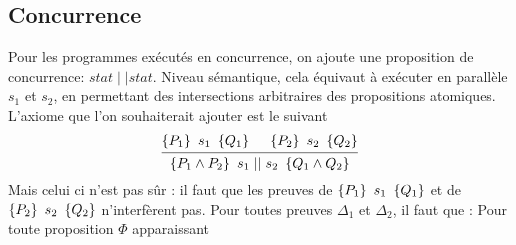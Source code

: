 \documentclass{cours}
\begin{document}
\subsection{Concurrence}
Pour les programmes exécutés en concurrence, on ajoute une proposition de concurrence: $stat \mid\mid stat$.
Niveau sémantique, cela équivaut à exécuter en parallèle $s_{1}$ et $s_{2}$, en permettant des intersections arbitraires des propositions atomiques.\\
L'axiome que l'on souhaiterait ajouter est le suivant
\begin{equation*}
	\begin{prooftree}
		\hypo{\hoare{P_{1}}{s_1}{Q_1}}
		\hypo{\hoare{P_2}{s_2}{Q_2}}
		\infer2{\hoare{P_1\land P_2}{s_{1} \mid \mid s_{2}}{Q_{1}\land Q_{2}}}
	\end{prooftree}
\end{equation*}
Mais celui ci n'est pas sûr : il faut que les preuves de $\left\{ P_{1}\right\}\ s_1 \ \left\{ Q_1\right\}$ et de $\left\{ P_2\right\}\ s_2 \ \left\{ Q_2\right\}$ n'interfèrent pas.
Pour toutes preuves $\Delta_{1}$ et $\Delta_{2}$, il faut que :
Pour toute proposition $\Phi$ apparaissant
\end{document}
